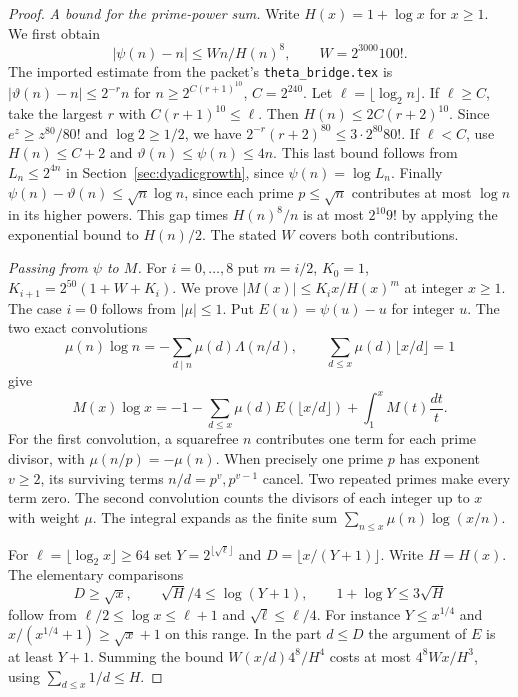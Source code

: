 \begin{proof}
\emph{A bound for the prime-power sum.}
Write $H(x)=1+\log x$ for $x\ge1$. We first obtain
\[
 |\psi(n)-n|\le W n/H(n)^8,\qquad W=2^{3000}100!.
\]
The imported estimate from the packet's \texttt{theta\_bridge.tex} is
$|\vartheta(n)-n|\le2^{-r}n$ for $n\ge2^{C(r+1)^{10}}$, $C=2^{240}$.
Let $\ell=\lfloor\log_2 n\rfloor$. If $\ell\ge C$, take the largest $r$ with $C(r+1)^{10}\le\ell$. Then $H(n)\le2C(r+2)^{10}$. Since $e^z\ge z^{80}/80!$ and $\log2\ge1/2$, we have $2^{-r}(r+2)^{80}\le 3\cdot 2^{80}80!$. If $\ell<C$, use $H(n)\le C+2$ and $\vartheta(n)\le\psi(n)\le 4n$. This last bound follows from $L_n\le2^{4n}$ in Section~\ref{sec:dyadicgrowth}, since $\psi(n)=\log L_n$. Finally $\psi(n)-\vartheta(n)\le\sqrt n\log n$, since each prime $p\le\sqrt n$ contributes at most $\log n$ in its higher powers. This gap times $H(n)^8/n$ is at most $2^{10}9!$ by applying the exponential bound to $H(n)/2$. The stated $W$ covers both contributions.

\emph{Passing from $\psi$ to $M$.}
For $i=0,\ldots,8$ put $m=i/2$, $K_0=1$, $K_{i+1}=2^{50}(1+W+K_i)$. We prove $|M(x)|\le K_i x/H(x)^m$ at integer $x\ge1$. The case $i=0$ follows from $|\mu|\le1$. Put $E(u)=\psi(u)-u$ for integer $u$. The two exact convolutions
\[
 \mu(n)\log n=-\sum_{d\mid n}\mu(d)\Lambda(n/d),
 \qquad \sum_{d\le x}\mu(d)\lfloor x/d\rfloor=1
\]
give
\begin{equation}
 M(x)\log x
 =-1-\sum_{d\le x}\mu(d) E(\lfloor x/d\rfloor)
       +\int_1^x M(t)\frac{dt}{t}.
 \label{eq:gram-m}
\end{equation}
For the first convolution, a squarefree $n$ contributes one term for each prime divisor, with $\mu(n/p)=-\mu(n)$. When precisely one prime $p$ has exponent $v\ge2$, its surviving terms $n/d=p^v,p^{v-1}$ cancel. Two repeated primes make every term zero. The second convolution counts the divisors of each integer up to $x$ with weight $\mu$. The integral expands as the finite sum $\sum_{n\le x}\mu(n)\log(x/n)$.

For $\ell=\lfloor\log_2 x\rfloor\ge64$ set
$Y=2^{\lfloor\sqrt\ell\rfloor}$ and $D=\lfloor x/(Y+1)\rfloor$. Write $H=H(x)$. The elementary comparisons
\[
 D\ge\sqrt x,\qquad \sqrt H/4\le\log(Y+1),\qquad
 1+\log Y\le3\sqrt H
\]
follow from $\ell/2\le\log x\le\ell+1$ and $\sqrt\ell\le\ell/4$. For instance $Y\le x^{1/4}$ and $x/(x^{1/4}+1)\ge\sqrt x+1$ on this range. In the part $d\le D$ the argument of $E$ is at least $Y+1$. Summing the bound $W(x/d)4^8/H^4$ costs at most $4^8 W x/H^3$, using $\sum_{d\le x}1/d\le H$.


\end{proof}
